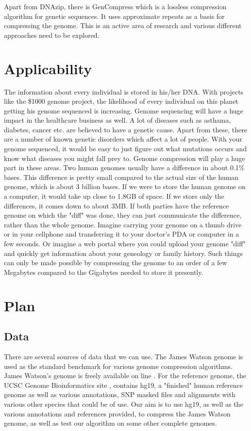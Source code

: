 \documentclass{article}
\begin{document}
Apart from DNAzip, there is GenCompress which is a lossless compression algorithm for genetic sequences. It uses approximate repeats as a basis for compressing the genome. This is an active area of research and various different approaches need to be explored.

\section {Applicability}
The information about every individual is stored in his/her DNA. With projects like the \$1000 genome project, the likelihood of every individual on this planet getting his genome sequenced is increasing. Genome sequencing will have a huge impact in the healthcare business as well. A lot of diseases such as asthama, diabetes, cancer etc. are believed to have a genetic cause. Apart from these, there are a number of known genetic disorders which affect a lot of people. With your genome sequenced, it would be easy to just figure out what mutations occurs and know what diseases you might fall prey to. Genome compression will play a huge part in these areas. Two human genomes usually have a difference in about 0.1\% bases. This difference is pretty small compared to the actual size of the human genome, which is about 3 billion bases. If we were to store the human genome on a computer, it would take up close to 1.8GB of space. If we store only the differences, it comes down to about 3MB. If both parties have the reference genome on which the "diff" was done, they can just communicate the difference, rather than the whole genome. Imagine carrying your genome on a thumb drive or in your cellphone and transferring it to your doctor's PDA or computer in a few seconds. Or imagine a web portal where you could upload your genome "diff" and quickly get information about your geneology or family history. Such things can only be made possible by compressing the genome to an order of a few Megabytes compared to the Gigabytes needed to store it presently.  

\clearpage

\section{Plan}

\subsection{Data}
There are several sources of data that we can use. The James Watson genome is used as the standard benchmark for various genome compression algorithms. James Watson's genome is freely available on line \cite{jwseq}. For the reference genome, the UCSC Genome Bioinformatics site \cite{ucschg}, contains hg19, a "finished" human reference genome as well as various annotations, SNP masked files and alignments with various other species that could be of use. Our aim is to use hg19, as well as the various annotations and references provided, to compress the James Watson genome, as well as test our algorithm on some other complete genomes. \\
\end{document}
